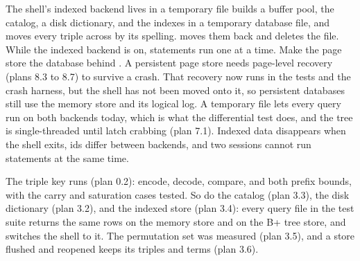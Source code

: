 \begin{decision}{The shell's indexed backend lives in a temporary file}
  builds a buffer pool,
the catalog, a disk dictionary, and the indexes in a temporary database file,
and moves every triple across by its spelling.  moves them back and deletes the file. While the indexed backend is on,
statements run one at a time.
 Make the page store the database behind
.
 A persistent page store needs page-level recovery (plans 8.3 to
8.7) to survive a crash. That recovery now runs in the tests and the crash
harness, but the shell has not been moved onto it, so persistent databases
still use the memory store and its logical log. A temporary file lets every query run on both backends
today, which is what the differential test does, and the tree is
single-threaded until latch crabbing (plan 7.1).
 Indexed data disappears when the shell exits, ids differ between
backends, and two sessions cannot run statements at the same time.
\end{decision}

\begin{status}
The triple key runs (plan 0.2): encode, decode, compare, and both prefix
bounds, with the carry and saturation cases tested. So do the catalog (plan
3.3), the disk dictionary (plan 3.2), and the indexed store (plan 3.4): every
query file in the test suite returns the same rows on the memory store and on
the B+ tree store, and  switches the
shell to it. The permutation set was measured (plan 3.5), and a store flushed
and reopened keeps its triples and terms (plan 3.6).
\end{status}

